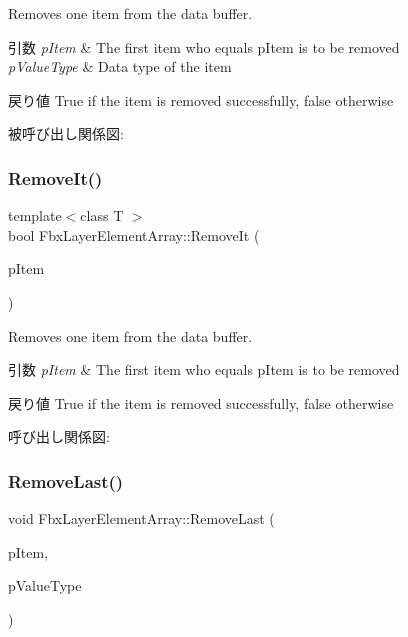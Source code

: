Removes one item from the data buffer. 
\begin{DoxyParams}{引数}
{\em p\+Item} & The first item who equals p\+Item is to be removed \\
\hline
{\em p\+Value\+Type} & Data type of the item \\
\hline
\end{DoxyParams}
\begin{DoxyReturn}{戻り値}
{\ttfamily True} if the item is removed successfully, {\ttfamily false} otherwise 
\end{DoxyReturn}
被呼び出し関係図\+:
\mbox{\label{class_fbx_layer_element_array_aca2bacda1beff3b7da61ed290a53cb19}} 
\subsubsection{\texorpdfstring{Remove\+It()}{RemoveIt()}\hspace{0.1cm}{\footnotesize\ttfamily [2/2]}}
{\footnotesize\ttfamily template$<$class T $>$ \\
bool Fbx\+Layer\+Element\+Array\+::\+Remove\+It (\begin{DoxyParamCaption}\item[{T $\ast$}]{p\+Item }\end{DoxyParamCaption})}

Removes one item from the data buffer. 
\begin{DoxyParams}{引数}
{\em p\+Item} & The first item who equals p\+Item is to be removed \\
\hline
\end{DoxyParams}
\begin{DoxyReturn}{戻り値}
{\ttfamily True} if the item is removed successfully, {\ttfamily false} otherwise 
\end{DoxyReturn}
呼び出し関係図\+:
\mbox{\label{class_fbx_layer_element_array_a928f848275334427d958c996e10e2535}} 
\subsubsection{\texorpdfstring{Remove\+Last()}{RemoveLast()}\hspace{0.1cm}{\footnotesize\ttfamily [1/2]}}
{\footnotesize\ttfamily void Fbx\+Layer\+Element\+Array\+::\+Remove\+Last (\begin{DoxyParamCaption}\item[{void $\ast$$\ast$}]{p\+Item,  }\item[{\hyperlink{fbxpropertytypes_8h_a73913a5ddfb20e57c6f25e9e6784bd92}{E\+Fbx\+Type}}]{p\+Value\+Type }\end{DoxyParamCaption})}

